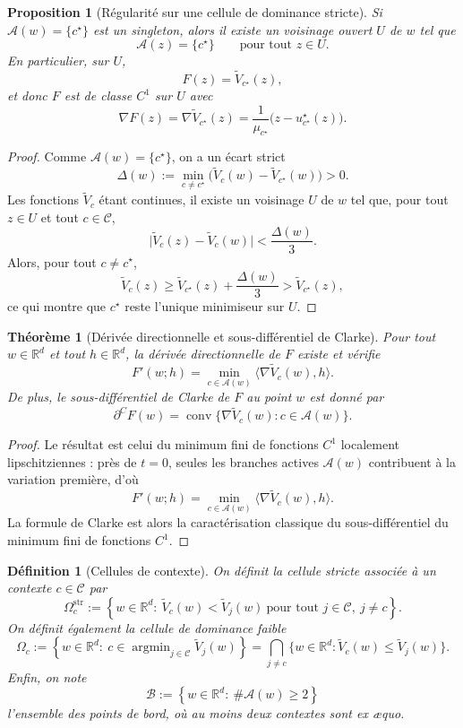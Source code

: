 \documentclass[11pt,a4paper]{article}
\newtheorem{definition}{Définition}[section]
\newtheorem{proposition}{Proposition}[section]
\newtheorem{theorem}{Théorème}[section]
\DeclareMathOperator{\argmin}{argmin}
\newcommand{\R}{\mathbb R}
\newcommand{\Ccal}{\mathcal C}
\begin{document}
\begin{proposition}[Régularité sur une cellule de dominance stricte]
Si \(\mathcal A(w)=\{c^\star\}\) est un singleton, alors il existe un voisinage ouvert \(U\) de \(w\) tel que
\[
\mathcal A(z)=\{c^\star\}
\qquad\text{pour tout }z\in U.
\]
En particulier, sur \(U\),
\[
F(z)=\widetilde V_{c^\star}(z),
\]
et donc \(F\) est de classe \(C^1\) sur \(U\) avec
\[
\nabla F(z)=\nabla \widetilde V_{c^\star}(z)
=\frac{1}{\mu_{c^\star}}\bigl(z-u_{c^\star}^\star(z)\bigr).
\]
\end{proposition}

\begin{proof}
Comme \(\mathcal A(w)=\{c^\star\}\), on a un écart strict
\[
\Delta(w):=\min_{c\neq c^\star}\bigl(\widetilde V_c(w)-\widetilde V_{c^\star}(w)\bigr)>0.
\]
Les fonctions \(\widetilde V_c\) étant continues, il existe un voisinage \(U\) de \(w\) tel que, pour tout \(z\in U\) et tout \(c\in\Ccal\),
\[
\bigl|\widetilde V_c(z)-\widetilde V_c(w)\bigr|<\frac{\Delta(w)}{3}.
\]
Alors, pour tout \(c\neq c^\star\),
\[
\widetilde V_c(z)\ge \widetilde V_{c^\star}(z)+\frac{\Delta(w)}{3}>\widetilde V_{c^\star}(z),
\]
ce qui montre que \(c^\star\) reste l'unique minimiseur sur \(U\).
\end{proof}

\begin{theorem}[Dérivée directionnelle et sous-différentiel de Clarke]
Pour tout \(w\in\R^d\) et tout \(h\in\R^d\), la dérivée directionnelle de \(F\) existe et vérifie
\[
F'(w;h)=\min_{c\in\mathcal A(w)}\langle \nabla \widetilde V_c(w),h\rangle.
\]
De plus, le sous-différentiel de Clarke de \(F\) au point \(w\) est donné par
\[
\partial^C F(w)
=
\operatorname{conv}\bigl\{\nabla \widetilde V_c(w): c\in\mathcal A(w)\bigr\}.
\]
\end{theorem}

\begin{proof}
Le résultat est celui du minimum fini de fonctions \(C^1\) localement lipschitziennes : près de \(t=0\), seules les branches actives \(\mathcal A(w)\) contribuent à la variation première, d'où
\[
F'(w;h)=\min_{c\in\mathcal A(w)}\langle \nabla \widetilde V_c(w),h\rangle.
\]
La formule de Clarke est alors la caractérisation classique du sous-différentiel du minimum fini de fonctions \(C^1\).
\end{proof}

\begin{definition}[Cellules de contexte]
On définit la cellule stricte associée à un contexte \(c\in\Ccal\) par
\[
\Omega_c^{\mathrm{str}}
:=
\left\{
w\in\R^d:\ \widetilde V_c(w)<\widetilde V_j(w)\ \text{pour tout }j\in\Ccal,\ j\neq c
\right\}.
\]
On définit également la cellule de dominance faible
\[
\Omega_c
:=
\left\{
w\in\R^d:\ c\in\argmin_{j\in\Ccal}\widetilde V_j(w)
\right\}
=
\bigcap_{j\neq c}\{w\in\R^d:\widetilde V_c(w)\le \widetilde V_j(w)\}.
\]
Enfin, on note
\[
\mathcal B
:=
\left\{
w\in\R^d:\ \#\mathcal A(w)\ge 2
\right\}
\]
l'ensemble des points de bord, où au moins deux contextes sont ex æquo.
\end{definition}
\end{document}
